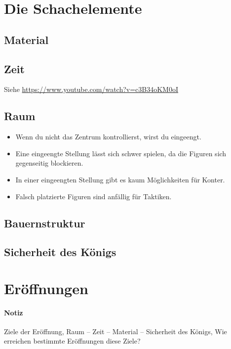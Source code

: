 \documentclass[
  a4paper,
  justified,
  nobib,
]{tufte-handout}
\newenvironment{notiz}{
  \color{Maroon}
  \paragraph*{Notiz}
}{
  \color{black}
}
\begin{document}
\section{Die Schachelemente}%
\label{sec:die_schachelemente}

\subsection{Material}%
\label{sub:material}

\subsection{Zeit}%
\label{sub:zeit}

Siehe \url{https://www.youtube.com/watch?v=c3B34oKM0oI}

\subsection{Raum}%
\label{sub:raum}

\begin{itemize}
  \item Wenn du nicht das Zentrum kontrollierst, wirst du eingeengt.
  \item Eine eingeengte Stellung lässt sich schwer spielen, da die Figuren sich
    gegenseitig blockieren.
  \item In einer eingeengten Stellung gibt es kaum Möglichkeiten für Konter.
  \item Falsch platzierte Figuren sind anfällig für Taktiken.
\end{itemize}

\subsection{Bauernstruktur}%
\label{sub:bauernstruktur}

\subsection{Sicherheit des Königs}%
\label{sub:sicherheit_des_konigs}

\section{Eröffnungen}%
\label{sec:eroffnungen}

\begin{notiz}
  Ziele der Eröffnung, Raum – Zeit – Material – Sicherheit des Königs, Wie erreichen
  bestimmte Eröffnungen diese Ziele?
\end{notiz}
\end{document}
